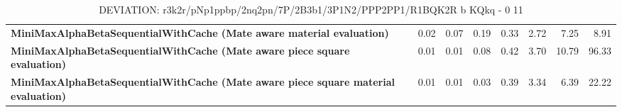\begin{table}[H]
{\begin{tabular}{|p{8cm}|*{7}{r|}}
            \rowcolor[HTML]{EFEFEF}
            \textbf{MiniMaxAlphaBetaSequentialWithCache (Mate aware material evaluation)}              & 0.02 & 0.07 & 0.19 & 0.33 & 2.72 & 7.25 & 8.91 \\
            \rowcolor[HTML]{FFFFFF}
            \textbf{MiniMaxAlphaBetaSequentialWithCache (Mate aware piece square evaluation)}               & 0.01 & 0.01 & 0.08 & 0.42 & 3.70 & 10.79 & 96.33 \\
            \rowcolor[HTML]{EFEFEF}
            \textbf{MiniMaxAlphaBetaSequentialWithCache (Mate aware piece square material evaluation)}               & 0.01 & 0.01 & 0.03 & 0.39 & 3.34 & 6.39 & 22.22 \\

            \hline
        \end{tabular}%
    }
    \caption{DEVIATION: r3k2r/pNp1ppbp/2nq2pn/7P/2B3b1/3P1N2/PPP2PP1/R1BQK2R b KQkq - 0 11}
    \label{tab:mid-game---fork---short-deviation}
\end{table}
